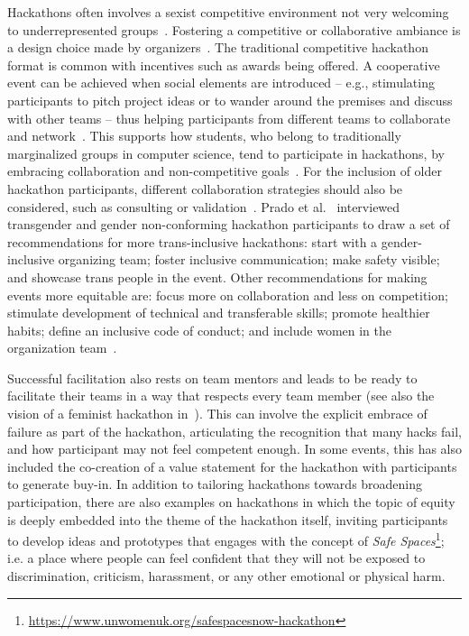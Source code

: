 \documentclass{ieeeaccess}
\begin{document}
Hackathons often involves a sexist competitive environment not very welcoming to underrepresented groups~\cite{warner2017}.  
Fostering a competitive or collaborative ambiance is a design choice made by organizers~\cite{pe2019designing}. 
The traditional competitive hackathon format is common with incentives such as awards being offered. 
A cooperative event can be achieved when social elements are introduced -- e.g., stimulating participants to pitch project ideas or to wander around the premises and discuss with other teams -- thus helping participants from different teams to collaborate and network~\cite{pe2022corporate}. 
This supports how students, who belong to traditionally marginalized groups in computer science, tend to participate in hackathons, by embracing collaboration and non-competitive goals~\cite{kos2019understanding}.  
For the inclusion of older hackathon participants, different collaboration strategies should also be considered, such as consulting or validation~\cite{kopec2018older}.
Prado et al.~\cite{prado2021trans} interviewed transgender and gender non-conforming hackathon participants to draw a set of recommendations for more trans-inclusive hackathons: start with a gender-inclusive organizing team; foster inclusive communication; make safety visible; and showcase trans people in the event.
Other recommendations for making events more equitable are: focus more on collaboration and less on competition; stimulate development of technical and transferable skills; promote healthier habits; define an inclusive code of conduct; and include women in the organization team~\cite{paganini2021promoting}.

Successful facilitation also rests on team mentors and leads to be ready to facilitate their teams in a way that respects every team member (see also the vision of a feminist hackathon in~\cite{disalvo2014building}). 
This can involve the explicit embrace of failure as part of the hackathon, articulating the recognition that many hacks fail, and how participant may not feel competent enough.
In some events, this has also included the co-creation of a value statement for the hackathon with participants to generate buy-in.
In addition to tailoring hackathons towards broadening participation, there are also examples on hackathons in which the topic of equity is deeply embedded into the theme of the hackathon itself, inviting participants to develop ideas and prototypes that engages with the concept of \textit{Safe Spaces}\footnote{\href{https://www.unwomenuk.org/safespacesnow-hackathon}{https://www.unwomenuk.org/safespacesnow-hackathon}}; i.e. a place where people can feel confident that they will not be exposed to discrimination, criticism, harassment, or any other emotional or physical harm.
\end{document}
